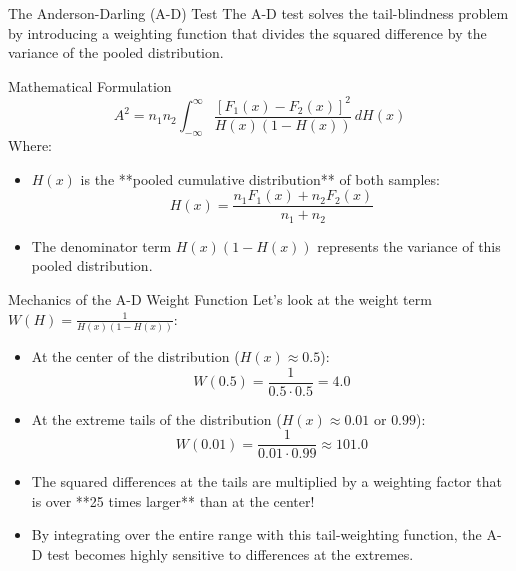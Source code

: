 \documentclass[9pt]{beamer}
\begin{document}
\begin{frame}{The Anderson-Darling (A-D) Test}
  The A-D test solves the tail-blindness problem by introducing a weighting function that divides the squared difference by the variance of the pooled distribution.
  \begin{block}{Mathematical Formulation}
    $$A^2 = n_1 n_2 \int_{-\infty}^{\infty} \frac{[F_1(x) - F_2(x)]^2}{H(x)(1 - H(x))} \, dH(x)$$
    Where:
    \begin{itemize}
      \item $H(x)$ is the **pooled cumulative distribution** of both samples:
        $$H(x) = \frac{n_1 F_1(x) + n_2 F_2(x)}{n_1 + n_2}$$
      \item The denominator term $H(x)(1 - H(x))$ represents the variance of this pooled distribution.
    \end{itemize}
  \end{block}
\end{frame}

\begin{frame}{Mechanics of the A-D Weight Function}
  Let's look at the weight term $W(H) = \frac{1}{H(x)(1-H(x))}$:
  \begin{itemize}
    \item At the center of the distribution ($H(x) \approx 0.5$):
      $$W(0.5) = \frac{1}{0.5 \cdot 0.5} = 4.0$$
    \item At the extreme tails of the distribution ($H(x) \approx 0.01$ or $0.99$):
      $$W(0.01) = \frac{1}{0.01 \cdot 0.99} \approx 101.0$$
    \item The squared differences at the tails are multiplied by a weighting factor that is over **25 times larger** than at the center!
    \item By integrating over the entire range with this tail-weighting function, the A-D test becomes highly sensitive to differences at the extremes.
  \end{itemize}
\end{frame}
\end{document}
